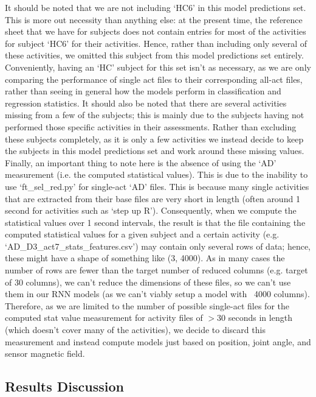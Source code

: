 \documentclass[12pt,twoside]{report}
\begin{document}
\quad It should be noted that we are not including ‘HC6’ in this model predictions set. This is more out necessity than anything else: at the present time, the reference sheet that we have for subjects does not contain entries for most of the activities for subject ‘HC6’ for their activities. Hence, rather than including only several of these activities, we omitted this subject from this model predictions set entirely. Conveniently, having an ‘HC’ subject for this set isn’t as necessary, as we are only comparing the performance of single act files to their corresponding all-act files, rather than seeing in general how the models perform in classification and regression statistics. It should also be noted that there are several activities missing from a few of the subjects; this is mainly due to the subjects having not performed those specific activities in their assessments. Rather than excluding these subjects completely, as it is only a few activities we instead decide to keep the subjects in this model predictions set and work around these missing values.\\

\quad Finally, an important thing to note here is the absence of using the ‘AD’ measurement (i.e. the computed statistical values). This is due to the inability to use ‘ft\_sel\_red.py’ for single-act ‘AD’ files. This is because many single activities that are extracted from their base files are very short in length (often around 1 second for activities such as ‘step up R’). Consequently, when we compute the statistical values over 1 second intervals, the result is that the file containing the computed statistical values for a given subject and a certain activity (e.g. ‘AD\_D3\_act7\_stats\_features.csv’) may contain only several rows of data; hence, these might have a shape of something like (3, 4000). As in many cases the number of rows are fewer than the target number of reduced columns (e.g. target of 30 columns), we can’t reduce the dimensions of these files, so we can’t use them in our RNN models (as we can’t viably setup a model with ~4000 columns). Therefore, as we are limited to the number of possible single-act files for the computed stat value measurement for activity files of $>$30 seconds in length (which doesn’t cover many of the activities), we decide to discard this measurement and instead compute models just based on position, joint angle, and sensor magnetic field.


\subsection{Results Discussion}
\end{document}
